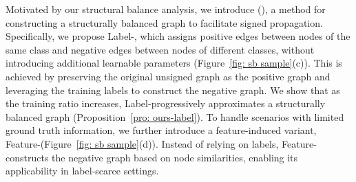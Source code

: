 
Motivated by our structural balance analysis, we introduce \oursfull (\ours), a method for constructing a structurally balanced graph to facilitate signed propagation. Specifically, we propose Label-\ours, which assigns positive edges between nodes of the same class and negative edges between nodes of different classes, without introducing additional learnable parameters (Figure~\ref{fig: sb sample}(c)). 
This is achieved by preserving the original unsigned graph as the positive graph and leveraging the training labels to construct the negative graph. We show that as the training ratio increases, Label-\ours progressively approximates a structurally balanced graph (Proposition~\ref{pro: ours-label}). To handle scenarios with limited ground truth information, we further introduce a feature-induced variant, Feature-\ours (Figure~\ref{fig: sb sample}(d)). Instead of relying on labels, Feature-\ours constructs the negative graph based on node similarities, enabling its applicability in label-scarce settings. 


